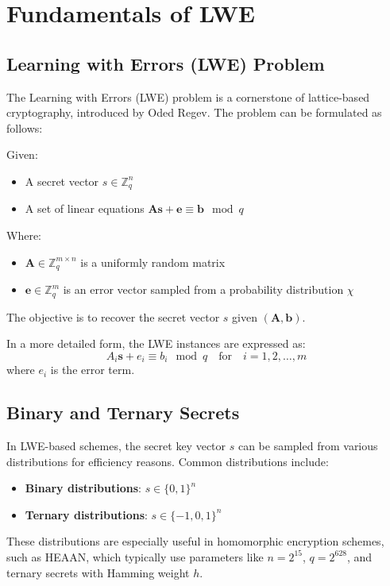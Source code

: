 \documentclass{article}
\begin{document}
\section{Fundamentals of LWE}

\subsection{Learning with Errors (LWE) Problem}
The Learning with Errors (LWE) problem is a cornerstone of lattice-based cryptography, introduced by Oded Regev. The problem can be formulated as follows:

Given:
\begin{itemize}
    \item A secret vector \( s \in \mathbb{Z}_q^n \)
    \item A set of linear equations \( \mathbf{A} \mathbf{s} + \mathbf{e} \equiv \mathbf{b} \mod q \)
\end{itemize}

Where:
\begin{itemize}
    \item \( \mathbf{A} \in \mathbb{Z}_q^{m \times n} \) is a uniformly random matrix
    \item \( \mathbf{e} \in \mathbb{Z}_q^m \) is an error vector sampled from a probability distribution \( \chi \)
\end{itemize}

The objective is to recover the secret vector \( s \) given \( (\mathbf{A}, \mathbf{b}) \).

In a more detailed form, the LWE instances are expressed as:
\[ 
A_i \mathbf{s} + e_i \equiv b_i \mod q \quad \text{for} \quad i = 1, 2, \ldots, m
\]
where \( e_i \) is the error term.

\subsection{Binary and Ternary Secrets}
In LWE-based schemes, the secret key vector \( s \) can be sampled from various distributions for efficiency reasons. Common distributions include:
\begin{itemize}
    \item \textbf{Binary distributions}: \( s \in \{0, 1\}^n \)
    \item \textbf{Ternary distributions}: \( s \in \{-1, 0, 1\}^n \)
\end{itemize}

These distributions are especially useful in homomorphic encryption schemes, such as HEAAN, which typically use parameters like \( n = 2^{15} \), \( q = 2^{628} \), and ternary secrets with Hamming weight \( h \).
\end{document}
